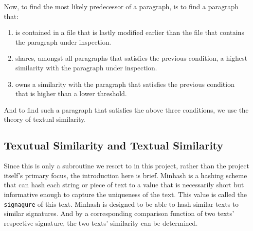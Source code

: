 \documentclass{article}
\begin{document}
Now, to find the most likely predecessor of a paragraph, is to find a paragraph that:
\begin{enumerate}
  \item is contained in a file that is lastly modified earlier than the file that contains the paragraph under inspection.
  \item shares, amongst all paragraphs that satisfies the previous condition, a highest similarity with the paragraph under inspection.
  \item owns a similarity with the paragraph that satisfies the previous condition that is higher than a lower threshold.
\end{enumerate}
And to find such a paragraph that satisfies the above three conditions, we use the theory of textual similarity. \\

\subsection{Texutual Similarity and Textual Similarity}
Since this is only a subroutine we resort to in this project, rather than the project itself's primary focus, the introduction here is brief. Minhash is a hashing scheme that can hash each string or piece of text to a value that is necessarily short but informative enough to capture the uniqueness of the text. This value is called the \texttt{signagure} of this text. Minhash is designed to be able to hash similar texts to similar signatures. And by a corresponding comparison function of two texts' respective signature, the two texts' similarity can be determined.
\end{document}
